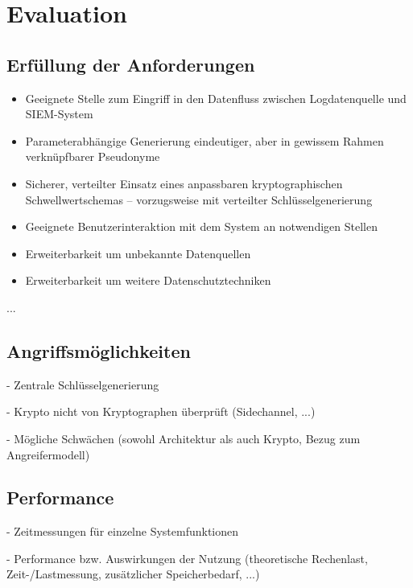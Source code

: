 \section{Evaluation}

\label{sec_impl_evaluation}

\subsection{Erfüllung der Anforderungen}

\begin{itemize}
  \item Geeignete Stelle zum Eingriff in den Datenfluss zwischen Logdatenquelle und SIEM-System
  \item Parameterabhängige Generierung eindeutiger, aber in gewissem Rahmen verknüpfbarer Pseudonyme
  \item Sicherer, verteilter Einsatz eines anpassbaren kryptographischen Schwellwertschemas -- vorzugsweise mit verteilter Schlüsselgenerierung
  \item Geeignete Benutzerinteraktion mit dem System an notwendigen Stellen
  \item Erweiterbarkeit um unbekannte Datenquellen
  \item Erweiterbarkeit um weitere Datenschutztechniken
\end{itemize}

...

\subsection{Angriffsmöglichkeiten}

- Zentrale Schlüsselgenerierung

- Krypto nicht von Kryptographen überprüft (Sidechannel, ...)

- Mögliche Schwächen (sowohl Architektur als auch Krypto, Bezug zum Angreifermodell)

\subsection{Performance}

- Zeitmessungen für einzelne Systemfunktionen

- Performance bzw. Auswirkungen der Nutzung (theoretische Rechenlast, Zeit-/Lastmessung, zusätzlicher Speicherbedarf, ...)